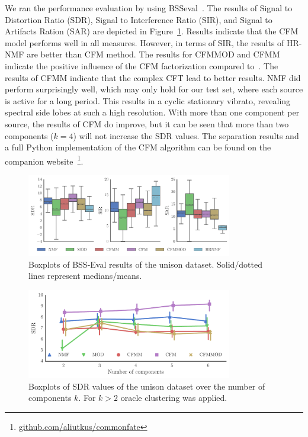 We ran the performance evaluation by using BSSeval~\cite{vincent06}. The results of Signal to Distortion
Ratio (SDR), Signal to Interference Ratio (SIR), and Signal to Artifacts Ration (SAR) are depicted in Figure~\ref{fig:boxplot_overall}. 
Results indicate that the CFM model performs well in all measures. 
However, in terms of SIR, the results of HR-NMF are better than CFM method. The results for CFMMOD and CFMM indicate the positive influence of the CFM factorization compared to~\cite{barker13}.
The results of CFMM indicate that the complex CFT lead to better results. NMF did perform surprisingly well, which may only hold for our test set, where each source is active for a long period. This results in a cyclic stationary vibrato, revealing spectral side lobes at such a high resolution. With more than one component per source, the results of CFM do improve, but it can be seen that more than two components ($k=4$) will not increase the SDR values. The separation results and a full Python implementation of the CFM algorithm can be found on the companion website~\footnote{\url{github.com/aliutkus/commonfate}}.

\begin{figure}[ht!]
\centering
        \includegraphics[width=0.8\textwidth]{Chapters/06_Separation_Unknown/figures/cfm_boxplot.pdf}
\caption{Boxplots of BSS-Eval results of the unison dataset. Solid/dotted lines represent medians/means.}
\label{fig:boxplot_overall}
\end{figure}

\begin{figure}[ht!]
\centering
        \includegraphics[width=0.8\textwidth]{Chapters/06_Separation_Unknown/figures/iterations.pdf}
\caption{Boxplots of SDR values of the unison dataset over the number of components $k$. For $k>2$ oracle clustering was applied.}
\label{fig:iterations}
\end{figure}

